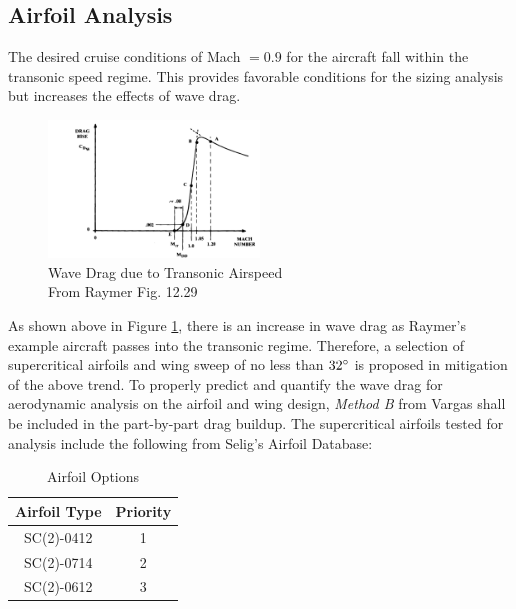\subsection{Airfoil Analysis}
The desired cruise conditions of Mach $= 0.9$ for the aircraft fall within the transonic speed regime.  This provides favorable conditions for the sizing analysis but increases the effects of wave drag.

\begin{figure}
    \vspace{-0.25in}
    \centering
    \includegraphics[width=0.5\textwidth]{Photos/wavedragduetotransonic.png}
    \caption{Wave Drag due to Transonic Airspeed\\{\small From Raymer Fig. 12.29\cite{raymer}}}
    \label{fig:transonic}
    \vspace{-0.5in}
\end{figure}

As shown above in Figure \ref{fig:transonic}, there is an increase in wave drag as Raymer's example aircraft passes into the transonic regime.  Therefore, a selection of supercritical airfoils and wing sweep of no less than $32\degree$ is proposed in mitigation of the above trend.  To properly predict and quantify the wave drag for aerodynamic analysis on the airfoil and wing design, \textit{Method B} from Vargas\cite{vargas} shall be included in the part-by-part drag buildup.  The supercritical airfoils tested for analysis include the following from Selig's Airfoil Database:

\begin{table}[!h]
    \centering
    \caption{Airfoil Options}
    \begin{tabular}{|c|c|} \toprule
        \textbf{Airfoil Type} & \textbf{Priority} \\ \hline \hline
        SC(2)-0412 & 1 \\ \hline
        SC(2)-0714 & 2 \\ \hline
        SC(2)-0612 & 3 \\ \hline
    \end{tabular}
    \label{tab:my_label}
\end{table}

